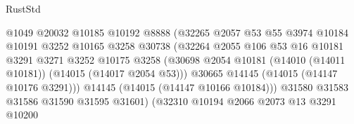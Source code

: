 \begin{lexlean}{RustStd}
\begin{coremodule}
                                          @1049
                                          @20032
                                          @10185
                                          @10192
                                          @8888
                                          (@32265
                                            @2057
                                            @53
                                            @55
                                            @3974
                                            @10184
                                            @10191
                                            @3252
                                            @10165
                                            @3258
                                            @30738
                                            (@32264
                                              @2055
                                              @106
                                              @53
                                              @16
                                              @10181
                                              @3291
                                              @3271
                                              @3252
                                              @10175
                                              @3258
                                              (@30698
                                                @2054
                                                @10181
                                                (@14010 (@14011 @10181))
                                                (@14015 (@14017 @2054 @53)))
                                              @30665
                                              @14145
                                              (@14015 (@14147 @10176 @3291)))
                                            @14145
                                            (@14015 (@14147 @10166 @10184)))
                                          @31580
                                          @31583
                                          @31586
                                          @31590
                                          @31595
                                          @31601)
                                        (@32310
                                          @10194
                                          @2066
                                          @2073
                                          @13
                                          @3291
                                          @10200

\end{coremodule}
\end{lexlean}
